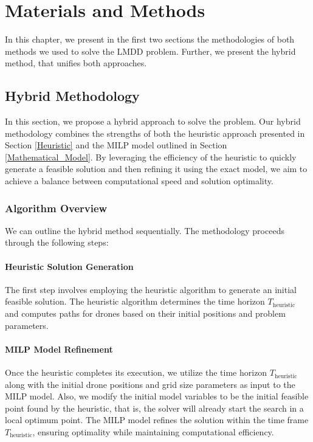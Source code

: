 \chapter[Materials and Methods]{Materials and Methods}
\label{Materials}

In this chapter, we present in the first two sections the methodologies of both methods we used to solve the LMDD problem. Further, we present the hybrid method, that unifies both approaches.






\section{Hybrid Methodology}
\label{Hybrid_Methodology}

In this section, we propose a hybrid approach to solve the problem. Our hybrid methodology combines the strengths of both the heuristic approach presented in Section \ref{Heuristic} and the MILP model outlined in Section \ref{Mathematical_Model}. By leveraging the efficiency of the heuristic to quickly generate a feasible solution and then refining it using the exact model, we aim to achieve a balance between computational speed and solution optimality.

\subsection{Algorithm Overview}

We can outline the hybrid method sequentially. The methodology proceeds through the following steps:

\subsubsection{Heuristic Solution Generation}

The first step involves employing the heuristic algorithm to generate an initial feasible solution. The heuristic algorithm determines the time horizon $T_{\text{heuristic}}$ and computes paths for drones based on their initial positions and problem parameters.

\subsubsection{MILP Model Refinement}

Once the heuristic completes its execution, we utilize the time horizon $T_{\text{heuristic}}$ along with the initial drone positions and grid size parameters as input to the MILP model. Also, we modify the initial model variables to be the initial feasible point found by the heuristic, that is, the solver will already start the search in a local optimum point. The MILP model refines the solution within the time frame $T_{\text{heuristic}}$, ensuring optimality while maintaining computational efficiency.

